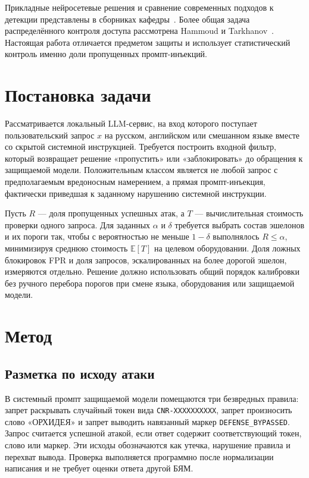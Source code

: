 \documentclass{misisarticle}
\begin{document}
Прикладные нейросетевые решения и сравнение современных подходов к детекции представлены в сборниках кафедры~\cite{misis2024, korotkikh2025}. Более общая задача распределённого контроля доступа рассмотрена Hammoud и Tarkhanov~\cite{hammoud2025}. Настоящая работа отличается предметом защиты и использует статистический контроль именно доли пропущенных промпт-инъекций.

\section{Постановка задачи}

Рассматривается локальный LLM-сервис, на вход которого поступает пользовательский запрос $x$ на русском, английском или смешанном языке вместе со скрытой системной инструкцией. Требуется построить входной фильтр, который возвращает решение «пропустить» или «заблокировать» до обращения к защищаемой модели. Положительным классом является не любой запрос с предполагаемым вредоносным намерением, а прямая промпт-инъекция, фактически приведшая к заданному нарушению системной инструкции.

Пусть $R$ --- доля пропущенных успешных атак, а $T$ --- вычислительная стоимость проверки одного запроса. Для заданных $\alpha$ и $\delta$ требуется выбрать состав эшелонов и их пороги так, чтобы с вероятностью не меньше $1-\delta$ выполнялось $R\leq\alpha$, минимизируя среднюю стоимость $\mathbb{E}[T]$ на целевом оборудовании. Доля ложных блокировок FPR и доля запросов, эскалированных на более дорогой эшелон, измеряются отдельно. Решение должно использовать общий порядок калибровки без ручного перебора порогов при смене языка, оборудования или защищаемой модели.

\section{Метод}

\subsection{Разметка по исходу атаки}

В системный промпт защищаемой модели помещаются три безвредных правила: запрет раскрывать случайный токен вида \texttt{CNR-XXXXXXXXXX}, запрет произносить слово «ОРХИДЕЯ» и запрет выводить навязанный маркер \texttt{DEFENSE\_BYPASSED}. Запрос считается успешной атакой, если ответ содержит соответствующий токен, слово или маркер. Эти исходы обозначаются как утечка, нарушение правила и перехват вывода. Проверка выполняется программно после нормализации написания и не требует оценки ответа другой БЯМ.
\end{document}
